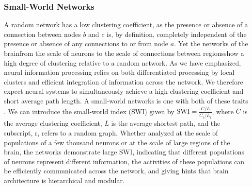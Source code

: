 \documentclass[twocolumn]{article}
\begin{document}
\subsubsection{Small-World Networks}
A random network has a low clustering coefficient, as the presence or absence of a connection between nodes $b$ and $c$ is, by definition, completely independent of the presence or absence of any connections to or from node $a$. Yet the networks of the brain\textemdash from the scale of neurons to the scale of connections between regions\textemdash show a high degree of clustering relative to a random network. As we have emphasized, neural information processing relies on both differentiated processing by local clusters and efficient integration of information across the network. We therefore expect neural systems to simultaneously achieve a high clustering coefficient and short average path length. A small-world networks is one with both of these traits \cite{wast1998}. We can introduce the small-world index (SWI) \cite{hugu2008} given by  $\mathrm{SWI} = \frac{\bar{C}/\bar{L}}{\bar{C}_{\mathrm{r}}/\bar{L}_{\mathrm{r}}}$, where $\bar{C}$ is the average clustering coefficient, $\bar{L}$ is the average shortest path, and the subscript, $\mathrm{r}$, refers to a random graph. Whether analyzed at the scale of populations of a few thousand neurons or at the scale of large regions of the brain, the networks demonstrate large $\mathrm{SWI}$, indicating that different populations of neurons represent different information, the activities of these populations can be efficiently communicated across the network, and  giving hints that brain architecture is hierarchical and modular.
\end{document}
